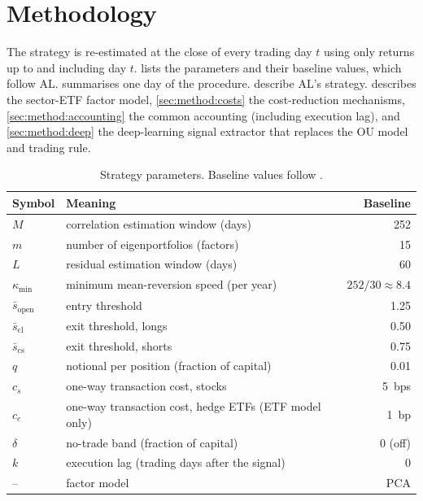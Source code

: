 \section{Methodology}
\label{sec:method}

The strategy is re-estimated at the close of every trading day $t$ using only returns up to and
including day $t$.  lists the parameters and their baseline values, which
follow AL.  summarises one day of the procedure.
describe AL's strategy.  describes the sector-ETF factor model,
\cref{sec:method:costs} the cost-reduction mechanisms, \cref{sec:method:accounting} the common
accounting (including execution lag), and \cref{sec:method:deep} the deep-learning signal
extractor that replaces the OU model and trading rule.

\begin{table}[ht]
\centering
\caption{Strategy parameters. Baseline values follow \citet{avellaneda2010}.}
\label{tab:params}
\begin{tabular}{llr}
\toprule
Symbol & Meaning & Baseline \\
\midrule
$M$ & correlation estimation window (days) & 252 \\
$m$ & number of eigenportfolios (factors) & 15 \\
$L$ & residual estimation window (days) & 60 \\
$\kappa_{\min}$ & minimum mean-reversion speed (per year) & $252/30 \approx 8.4$ \\
$\bar s_{\text{open}}$ & entry threshold & 1.25 \\
$\bar s_{\text{cl}}$ & exit threshold, longs & 0.50 \\
$\bar s_{\text{cs}}$ & exit threshold, shorts & 0.75 \\
$q$ & notional per position (fraction of capital) & 0.01 \\
$c_s$ & one-way transaction cost, stocks & 5~bps \\
$c_e$ & one-way transaction cost, hedge ETFs (ETF model only) & 1~bp \\
$\delta$ & no-trade band (fraction of capital) & 0 (off) \\
$k$ & execution lag (trading days after the signal) & 0 \\
-- & factor model & PCA \\
\bottomrule
\end{tabular}
\end{table}

